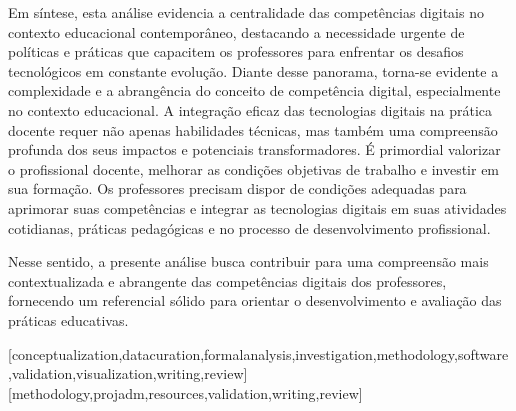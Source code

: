 \documentclass[portuguese]{textolivre}
\begin{document}
Em síntese, esta análise evidencia a centralidade das competências
digitais no contexto educacional contemporâneo, destacando a necessidade
urgente de políticas e práticas que capacitem os professores para
enfrentar os desafios tecnológicos em constante evolução. Diante desse
panorama, torna-se evidente a complexidade e a abrangência do conceito
de competência digital, especialmente no contexto educacional. A
integração eficaz das tecnologias digitais na prática docente requer não
apenas habilidades técnicas, mas também uma compreensão profunda dos
seus impactos e potenciais transformadores. É primordial valorizar o
profissional docente, melhorar as condições objetivas de trabalho e
investir em sua formação. Os professores precisam dispor de condições
adequadas para aprimorar suas competências e integrar as tecnologias
digitais em suas atividades cotidianas, práticas pedagógicas e no
processo de desenvolvimento profissional.

Nesse sentido, a presente análise busca contribuir para uma compreensão
mais contextualizada e abrangente das competências digitais dos
professores, fornecendo um referencial sólido para orientar o
desenvolvimento e avaliação das práticas educativas.

\printbibliography\label{sec-bib}
\begin{contributors}
[conceptualization,datacuration,formalanalysis,investigation,methodology,software,validation,visualization,writing,review]
[methodology,projadm,resources,validation,writing,review]
\end{contributors}
\end{document}
